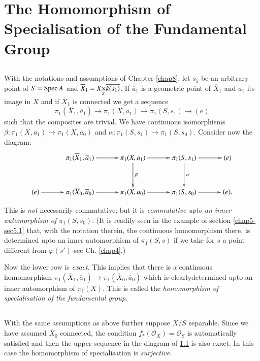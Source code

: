 \chapter[The Homomorphism of Specialisation.....]{The Homomorphism of Specialisation of the Fundamental
  Group}\label{chap9} 

\section{}\label{chap9-sec9.1}\pageoriginale
With the notations and assumptions of Chapter \ref{chap8}, let $s_{1}$ be an
arbitrary point of $S=\operatorname{Spec} A$ and
$\overline{X}_{1}=\fprod{X}{\overline{k(s_{1})}}{S}$. If
$\overline{a}_{1}$ is a geometric point of $\overline{X}_{1}$ and
$a_{1}$ its image in $X$ and if $\overline{X}_{1}$ is connected we get
a sequence
$$
\pi_{1}(\overline{X}_{1},\overline{a}_{1})\to \pi_{1}(X,a_{1})\to
\pi_{1}(S,s_{1})\to (e)
$$
such that the composites are trivial. We have continuous isomorphisms
$\beta:\pi_{1}(X,a_{1})\to \pi_{1}(X,a_{0})$ and
$\alpha:\pi_{1}(S,s_{1})\to \pi_{1}(S,s_{0})$. Consider now the
diagram:
\[
\xymatrix@=1.1cm{
& \pi_{1}(\overline{X}_{1},\overline{a}_{1})\ar[r] &
\pi_{1}(X,a_{1})\ar[d]^{\beta} \ar[r] &
\pi_{1}(S,s_{1})\ar[d]^{\alpha}\ar[r] & (e)\\
(e)\ar[r] & \pi_{1}(\overline{X}_{0},\overline{a}_{0})\ar[r] &
\pi_{1}(X,a_{0})\ar[r] & \pi_{1}(S,s_{0})\ar[r] & (e).
}
\]

This is {\em not} necessarily commutative; but it is {\em commutative
  upto an inner automorphism of} $\pi_{1}(S,s_{0})$. (It is readily
seen in the example of section \ref{chap5-sec5.1} that, with the notation
therein, the continuous homomorphism there, is determined upto an
inner automorphism of $\pi_{1}(S,s)$ if we take for $s$ a point
different from $\varphi(s')$-see Ch. \ref{chap4}.)

Now the lower row is {\em exact}. This implies that there is a
continuous homomorphism $\pi_{1}(\overline{X}_{1},\overline{a}_{1})\to
\pi_{1}(\overline{X}_{0},\overline{a}_{0})$ which is
clearly\pageoriginale determined upto an inner automorphism of
$\pi_{1}(X)$. This is called the {\em homomorphism of specialisation
  of the fundamental group.}

\section{}\label{chap9-sec9.2}
With the same assumptions as above further suppose $X/S$
separable. Since we have assumed $\overline{X}_{0}$ connected, the
condition $f_{\ast}(\mathscr{O}_{X})=\mathscr{O}_{S}$ is automatically
satisfied and then the upper sequence in the diagram of \ref{chap9-sec9.1}
is also exact. In this case the homomorphism of specialisation is {\em
  surjective.} 

